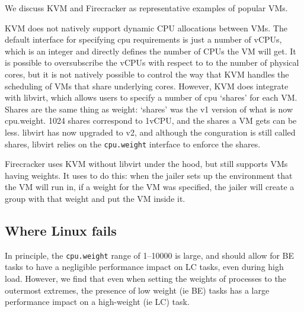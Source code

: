 We discuss KVM and Firecracker as representative examples of popular VMs.

KVM does not natively support dynamic CPU allocations between VMs. The default
interface for specifying cpu requirements is just a number of vCPUs, which is an
integer and directly defines the number of CPUs the VM will get. It is possible
to oversubscribe the vCPUs with respect to to the number of physical cores, but
it is not natively possible to control the way that KVM handles the scheduling
of VMs that share underlying cores. However, KVM does integrate with libvirt,
which allows users to specify a number of cpu `shares' for each VM. Shares are
the same thing as weight: `shares' was the \cgroups{} v1 version of what is now
cpu.weight. 1024 shares correspond to 1vCPU, and the shares a VM gets can be
less. libvirt has now upgraded to \cgroups{} v2, and although the conguration is
still called shares, libvirt relies on the \texttt{cpu.weight} interface to
enforce the shares.

Firecracker uses KVM without libvirt under the hood, but still supports VMs
having weights. It uses \cgroups{} to do this: when the jailer sets up the
environment that the VM will run in, if a weight for the VM was specified, the
jailer will create a group with that weight and put the VM inside it.


\subsection{Where Linux fails}

In principle, the \texttt{cpu.weight} range of 1--10000 is large, and should
allow for BE tasks to have a negligible performance impact on LC tasks, even
during high load. However, we find that even when setting the weights of
processes to the outermost extremes, the presence of low weight (ie BE) tasks
has a large performance impact on a high-weight (ie LC) task.


